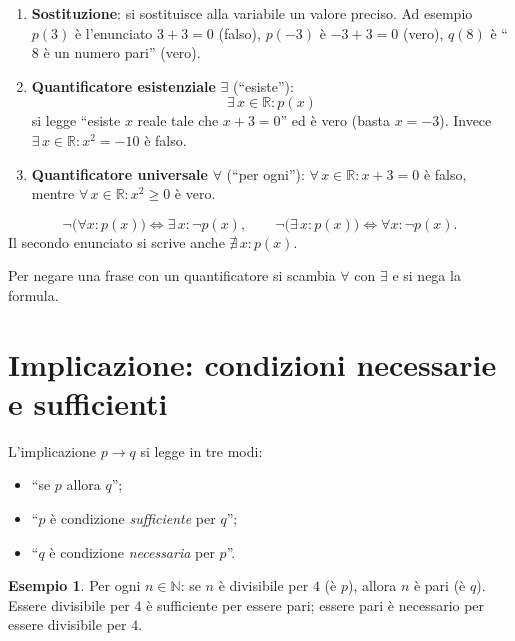\documentclass[11pt,a4paper]{article}
\theoremstyle{definition}
\newtheorem*{esempio}{Esempio}
\begin{document}
\begin{enumerate}
    \item \textbf{Sostituzione}: si sostituisce alla variabile un valore
          preciso. Ad esempio $p(3)$ è l'enunciato $3 + 3 = 0$ (falso),
          $p(-3)$ è $-3 + 3 = 0$ (vero), $q(8)$ è ``$8$ è un numero pari''
          (vero).

    \item \textbf{Quantificatore esistenziale} $\exists$ (``esiste''):
          \[
          \exists\, x \in \mathbb{R} : p(x)
          \]
          si legge ``esiste $x$ reale tale che $x + 3 = 0$'' ed è vero
          (basta $x = -3$). Invece
          $\exists\, x \in \mathbb{R} : x^2 = -10$ è falso.

    \item \textbf{Quantificatore universale} $\forall$ (``per ogni''):
          $\forall\, x \in \mathbb{R} : x + 3 = 0$ è falso, mentre
          $\forall\, x \in \mathbb{R} : x^2 \geq 0$ è vero.
\end{enumerate}

\begin{proposizione}
\[
\neg\big(\forall x : p(x)\big) \iff \exists\, x : \neg p(x), \qquad
\neg\big(\exists\, x : p(x)\big) \iff \forall x : \neg p(x).
\]
Il secondo enunciato si scrive anche $\nexists\, x : p(x)$.
\end{proposizione}

Per negare una frase con un quantificatore si scambia $\forall$ con
$\exists$ e si nega la formula.

\section{Implicazione: condizioni necessarie e sufficienti}

L'implicazione $p \to q$ si legge in tre modi:
\begin{itemize}
    \item ``se $p$ allora $q$'';
    \item ``$p$ è condizione \emph{sufficiente} per $q$'';
    \item ``$q$ è condizione \emph{necessaria} per $p$''.
\end{itemize}

\begin{esempio}
Per ogni $n \in \mathbb{N}$: se $n$ è divisibile per $4$ (è $p$), allora
$n$ è pari (è $q$). Essere divisibile per $4$ è sufficiente per essere
pari; essere pari è necessario per essere divisibile per $4$.
\end{esempio}
\end{document}
